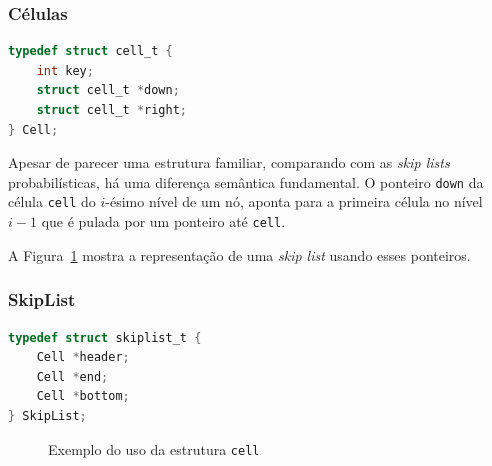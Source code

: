 \documentclass[paper=a4, fontsize=11pt]{scrartcl} %
\newcommand{\snode}[2]{\node(#1)[item]{\ensuremath{#2}}}
\numberwithin{equation}{section}
\numberwithin{figure}{section}
\numberwithin{table}{section}
\numberwithin{definition}{section}
\numberwithin{theorem}{section}
\numberwithin{property}{section}
\numberwithin{proposition}{section}
\newcommand{\sls}{\textit{skip lists}\xspace}
\renewcommand{\sl}{\textit{skip list}\xspace}
\begin{document}
\subsubsection{Células}

\begin{lstlisting}[caption=Estrutura das Células, language=C]
typedef struct cell_t {
    int key;
    struct cell_t *down;
    struct cell_t *right;
} Cell;
\end{lstlisting}

Apesar de parecer uma estrutura familiar, comparando com as \sls probabilísticas, há uma diferença
semântica fundamental. O ponteiro \verb|down| da célula \verb|cell| do $i$-ésimo nível de um nó,
aponta para a primeira célula no nível $i - 1$ que é pulada por um ponteiro até \verb|cell|.

A Figura~\ref{fig:cell_structure} mostra a representação de uma \sl usando esses ponteiros.

\subsubsection{SkipList}
\begin{lstlisting}[caption=Estrutura das Skip Lists determinísticas, language=C]
typedef struct skiplist_t {
    Cell *header;
    Cell *end;
    Cell *bottom;
} SkipList;
\end{lstlisting}


\begin{figure}
  \centering
  \caption{Exemplo do uso da estrutura \texttt{cell}}
  \label{fig:cell_structure}
\end{figure}
\end{document}
